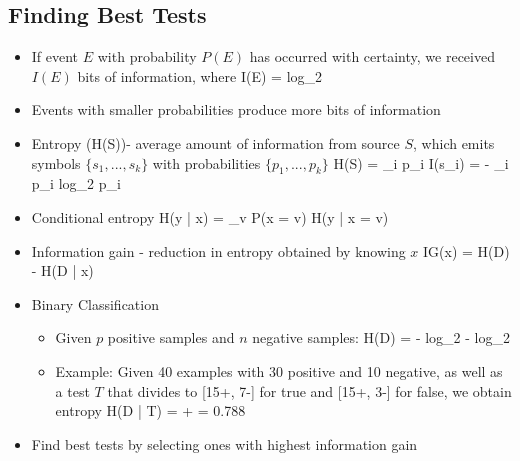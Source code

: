 \documentclass[12pt]{article}
\newenvironment{eqn}{\equation\alignedat{3}}{\endalignedat\endequation}
\begin{document}
\subsection{Finding Best Tests}

\begin{itemize}
	\item If event $E$ with probability $P(E)$ has occurred with certainty, we received $I(E)$ bits of information, where
	\begin{eqn}
		I(E) = log_2 
	\end{eqn}
	\item Events with smaller probabilities produce more bits of information 
	\item Entropy (H(S))- average amount of information from source $S$, which emits symbols $\{s_1, ..., s_k\}$ with probabilities $\{p_1, ..., p_k\}$
	\begin{eqn}
		H(S) = \Sigma_i p_i I(s_i) = - \Sigma_i p_i log_2 p_i
	\end{eqn}
	\item Conditional entropy
	\begin{eqn}
		H(y | x) = \Sigma_v P(x = v) H(y | x = v)
	\end{eqn}
	\item Information gain - reduction in entropy obtained by knowing $x$
	\begin{eqn}
		IG(x) = H(D) - H(D | x)
	\end{eqn}
	\item Binary Classification 
	\begin{itemize}
		\item Given $p$ positive samples and $n$ negative samples:
		\begin{eqn}
			H(D) = - log_2  -  log_2 
		\end{eqn}
		\item Example: Given 40 examples with 30 positive and 10 negative, as well as a test $T$ that divides to [15+, 7-] for true and [15+, 3-] for false, we obtain entropy 
		\begin{eqn}
			H(D | T) =  +   = 0.788
		\end{eqn}
	\end{itemize}
	\item Find best tests by selecting ones with highest information gain 
\end{itemize}
\end{document}
